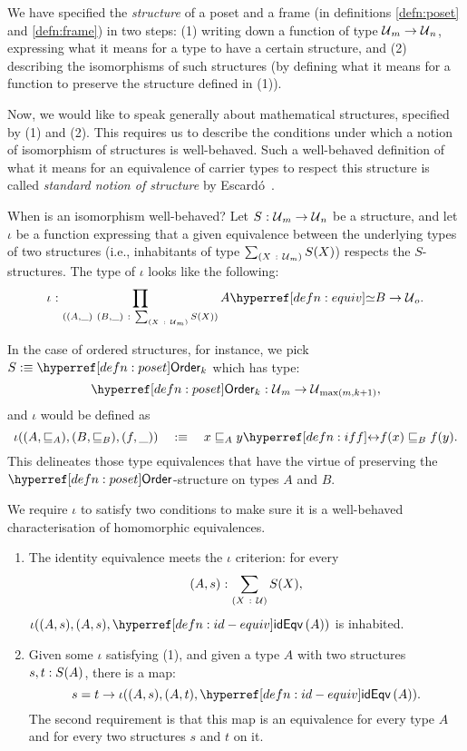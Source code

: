 We have specified the \emph{structure} of a poset and a frame (in definitions
\ref{defn:poset} and \ref{defn:frame}) in two steps: (1) writing down a function of type
$\mathcal{U}{}_m \rightarrow \mathcal{U}{}_n$, expressing what it means for a type to have a certain structure,
and (2) describing the isomorphisms of such structures (by defining what it means for a
function to preserve the structure defined in (1)).

Now, we would like to speak generally about mathematical structures, specified by (1) and
(2). This requires us to describe the conditions under which a notion of isomorphism of
structures is well-behaved. Such a well-behaved definition of what it means for an
equivalence of carrier types to respect this structure is called
\emph{standard notion of structure} by Escard\'{o}~\cite{escardo-uf-intro}.

When is an isomorphism well-behaved? Let $S\hspace{0.1mm}:\hspace{0.1mm}\mathcal{U}{}_m \rightarrow \mathcal{U}{}_n$ be a structure,
and let $\iota$ be a function expressing that a given equivalence between the underlying
types of two structures (i.e., inhabitants of type $\sum_{(X~:~\mathcal{U}{}_m)} S(X)$)
respects the $S$-structures. The type of $\iota$ looks like the following:
\begin{equation*}
  \oftyI{\iota}{%
    \pity{(A , \_)~(B , \_)}{\sigmaty{X}{\univ{}_m}{S(X)}}{%
      \typequiv{A}{B} \rightarrow \univ{}_o
    }
  }.
\end{equation*}

In the case of ordered structures, for instance, we pick $S \is \ordernm{}_k$ which has
type:
\begin{equation*}
  \oftyI{\ordernm{}_k}{\univ{}_m \rightarrow \univ{}_{\max(m, k+1)}},
\end{equation*}
and $\iota$ would be defined as
\begin{equation*}
  \iota((A, \sqsubseteq_A), (B, \sqsubseteq_B), (f , \_)) \quad\is\quad \logequiv{x \sqsubseteq_A y}{f(x) \sqsubseteq_B f(y)}.
\end{equation*}
This delineates those type equivalences that have the virtue of preserving the
$\ordernm{}$-structure on types $A$ and $B$.

We require $\iota$ to satisfy two conditions to make sure it is a well-behaved
characterisation of homomorphic equivalences.
\begin{enumerate}
  \item The identity equivalence meets the $\iota$ criterion: for every $$(A,
    s)\hspace{0.1mm}:\hspace{0.1mm}\sum_{(X~:~\mathcal{U}{})} S(X),$$ $\iota((A, s), (A, s), \idequiv{A})$ is inhabited.
  \item Given some $\iota$ satisfying (1), and given a type $A$ with two structures
    $s, t:S(A)$, there is a map:
    \begin{equation*}
      s = t \rightarrow \iota((A, s), (A, t), \idequiv{A}).
    \end{equation*}
    The second requirement is that this map is an equivalence for every type $A$ and for
    every two structures $s$ and $t$ on it.
\end{enumerate}

